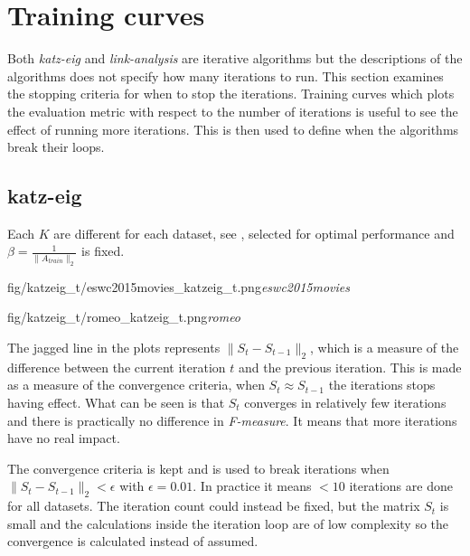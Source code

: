 
\section{Training curves}\label{sec:graphs:training_curves}

Both \textit{katz-eig} and \textit{link-analysis} are iterative algorithms but the descriptions of the algorithms does not specify how many iterations to run. This section examines the stopping criteria for when to stop the iterations.  Training curves which plots the evaluation metric with respect to the number of iterations is useful to see the effect of running more iterations. This is then used to define when the algorithms break their loops.


\subsection{katz-eig}\label{sec:training:katz}

Each $K$ are different for each dataset, see , selected for optimal performance and $\beta = \frac{1}{\|A_{train}\|_2}$ is fixed.

\FloatBarrier

{fig/katzeig_t/eswc2015movies_katzeig_t.png}{\textit{eswc2015movies}}

{fig/katzeig_t/romeo_katzeig_t.png}{\textit{romeo}}

The jagged line in the plots represents $\|S_t - S_{t - 1}\|_2$, which is a measure of the difference between the current iteration $t$ and the previous iteration. This is made as a measure of the convergence criteria, when $S_t \approx S_{t - 1}$ the iterations stops having effect. What can be seen is that $S_t$ converges in relatively few iterations and there is practically no difference in \textit{F-measure}. It means that more iterations have no real impact.

\FloatBarrier %

The convergence criteria is kept and is used to break iterations when $\|S_t - S_{t - 1}\|_2 < \epsilon$ with $\epsilon = 0.01$. In practice it means $< 10$ iterations are done for all datasets. The iteration count could instead be fixed, but the matrix $S_t$ is small and the calculations inside the iteration loop are of low complexity so the convergence is calculated instead of assumed.

